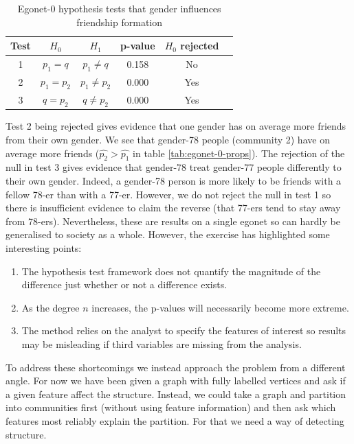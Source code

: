 \documentclass[]{article}
\begin{document}
\begin{table}[!h]
	\centering
	\begin{tabular}{cccccc}
		Test & $H_0$                & $H_1$                & p-value & $H_0$ rejected       \\ \hline
		1    & $p_1 = q$            & $p_1 \neq q$         & 0.158 &  No                \\
		2    & $p_1 = p_2$ & $p_1 \neq p_2$ & 0.000 & Yes \\
		3    & $q = p_2$ & $q \neq p_2$ &  0.000 & Yes
	\end{tabular}
	\caption{Egonet-0 hypothesis tests that gender influences friendship formation}
	\label{tab:egonet-0-hyp-tests}
\end{table}

Test 2 being rejected gives evidence that one gender has on average more friends from their own gender. We see that gender-78 people (community 2) have on average more friends ($\hat{p_2} > \hat{p_1}$ in table \ref{tab:egonet-0-props}). The rejection of the null in test 3 gives evidence that gender-78 treat gender-77 people differently to their own gender. Indeed, a gender-78 person is more likely to be friends with a fellow 78-er than with a 77-er. However, we do not reject the null in test 1 so there is insufficient evidence to claim the reverse (that 77-ers tend to stay away from 78-ers). Nevertheless, these are results on a single egonet so can hardly be generalised to society as a whole. However, the exercise has highlighted some interesting points:

\begin{enumerate}
	\item The hypothesis test framework does not quantify the magnitude of the difference just whether or not a difference exists.
	\item As the degree $n$ increases, the p-values will necessarily become more extreme.
	\item The method relies on the analyst to specify the features of interest so results may be misleading if third variables are missing from the analysis.
\end{enumerate} 

To address these shortcomings we instead approach the problem from a different angle. For now we have been given a graph with fully labelled vertices and ask if a given feature affect the structure. Instead, we could take a graph and partition into communities first (without using feature information) and then ask which features most reliably explain the partition. For that we need a way of detecting structure.
\end{document}
